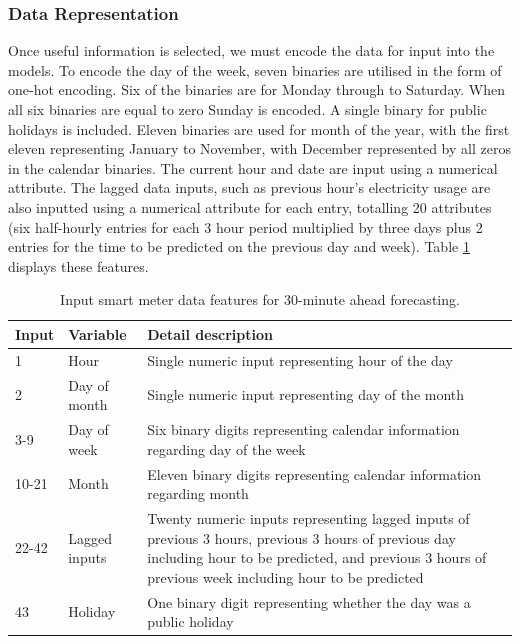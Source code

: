 \subsubsection{Data Representation}

Once useful information is selected, we must encode the data for input into the models. To encode the day of the week, seven binaries are utilised in the form of one-hot encoding. Six of the binaries are for Monday through to Saturday. When all six binaries are equal to zero Sunday is encoded. A single binary for public holidays is included. Eleven binaries are used for month of the year, with the first eleven representing January to November, with December represented by all zeros in the calendar binaries. The current hour and date are input using a numerical attribute. The lagged data inputs, such as previous hour's electricity usage are also inputted using a numerical attribute for each entry, totalling 20 attributes (six half-hourly entries for each 3 hour period multiplied by three days plus 2 entries for the time to be predicted on the previous day and week). Table \ref{tab:feature} displays these features.


\begin{table}
	\begin{tabular}{p{3cm}p{3cm}p{8cm}}
		\toprule
		Input & Variable      & Detail description \\
		\midrule
		1     & Hour          & Single numeric input representing hour of the day                                                                                              \\
		2     & Day of month  & Single numeric input representing day of the month                                                                                             \\
		3-9   & Day of week   & Six binary digits representing calendar information regarding day of the week                                                                                            \\
		10-21 & Month         & Eleven binary digits representing calendar information regarding month                                                                                         \\
		22-42 & Lagged inputs & Twenty numeric inputs representing lagged inputs of previous 3 hours, previous 3 hours of previous day including hour to be predicted, and previous 3 hours of previous week including hour to be predicted \\
		43    & Holiday       & One binary digit representing whether the day was a public holiday  \\     \bottomrule                                                           
	\end{tabular}
	\caption{Input smart meter data features for 30-minute ahead forecasting.}
	\label{tab:feature}
\end{table}


